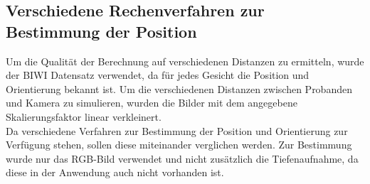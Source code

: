 \subsection{Verschiedene Rechenverfahren zur Bestimmung der Position}
Um die Qualität der Berechnung auf verschiedenen Distanzen zu ermitteln, wurde der BIWI Datensatz \cite{database_Face_Ori} verwendet, da für jedes Gesicht die Position und Orientierung bekannt ist.
Um die verschiedenen Distanzen zwischen Probanden und Kamera zu simulieren, wurden die Bilder mit dem angegebene Skalierungsfaktor linear verkleinert.\\
Da verschiedene Verfahren zur Bestimmung der Position und Orientierung zur Verfügung stehen, sollen diese miteinander verglichen werden. Zur Bestimmung wurde nur das RGB-Bild verwendet und nicht zusätzlich die Tiefenaufnahme, da diese in der Anwendung auch nicht vorhanden ist.
